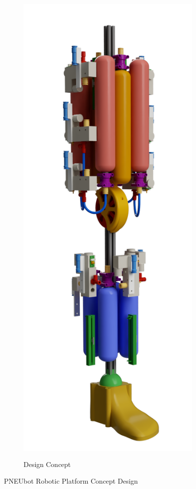 \documentclass[11pt,a4paper]{article}
\begin{document}
\begin{figure}[hbt!]
\begin{subfigure}[t]{0.4 \textwidth}
        \label{fig:platform_side}
    \end{subfigure}
    \begin{subfigure}[t]{0.4 \textwidth}
        \centering
        \caption{Design Concept}
        \includegraphics[scale=0.2]{Leg_Render.PNG}
        \label{fig:platform_angle}
    \end{subfigure}
    \caption{PNEUbot Robotic Platform Concept Design}
\end{figure}
\end{document}
